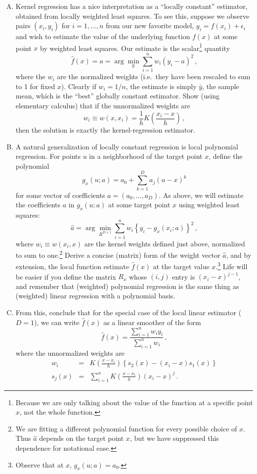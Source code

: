 \documentclass{mynotes}
\begin{document}
\begin{enumerate}[(A)]

\item Kernel regression has a nice interpretation as a ``locally constant'' estimator, obtained from locally weighted least squares.  To see this, suppose we observe pairs $(x_i, y_i)$ for $i = 1, \ldots, n$ from our new favorite model, $y_i = f(x_i) + \epsilon_i$ and wish to estimate the value of the underlying function $f(x)$ at some point $x$ by weighted least squares.  Our estimate is the scalar\footnote{Because we are only talking about the value of the function at a specific point $x$, not the whole function.} quantity
$$
\hat{f}(x) = a = \arg \min_{\mathbb{R}} \sum_{i=1}^n w_i (y_i - a)^2 \, ,
$$
where the $w_i$ are the normalized weights (i.e.~they have been rescaled to sum to 1 for fixed $x$).  Clearly if $w_i = 1/n$, the estimate is simply $\bar{y}$, the sample mean, which is the ``best'' globally constant estimator.  Show (using elementary calculus) that if the unnormalized weights are
$$
w_i \equiv w(x, x_i) = \frac{1}{h} K \left( \frac{x_i - x}{h} \right)  \, ,
$$
then the solution is exactly the kernel-regression estimator.

\item  A natural generalization of locally constant regression is local polynomial regression.  For points $u$ in a neighborhood of the target point $x$, define the polynomial
$$
g_{x}(u; a) = a_0 + \sum_{k=1}^D a_j(u-x)^k 
$$
for some vector of coefficients $a = (a_0, \ldots, a_D)$.  As above, we will estimate the coefficients $a$ in $g_{x}(u; a)$ at some target point $x$ using weighted least squares:
$$
\hat{a} = \arg \min_{R^{D+1}} \sum_{i=1}^n w_i \left\{ y_i - g_{x}(x_i; a)  \right\}^2 \, ,
$$
where $w_i \equiv w(x_i, x)$ are the kernel weights defined just above, normalized to sum to one.\footnote{We are fitting a different polynomial function for every possible choice of $x$.  Thus $\hat{a}$ depends on the target point $x$, but we have suppressed this dependence for notational ease.} Derive a concise (matrix) form of the weight vector $\hat{a}$, and by extension, the local function estimate $\hat{f}(x)$ at the target value $x$.\footnote{Observe that at $x$, $g_x(u; a) = a_0$.}   Life will be easier if you define the matrix $R_x$ whose $(i,j)$ entry is $(x_i-x)^{j-1}$, and remember that (weighted) polynomial regression is the same thing as (weighted) linear regression with a polynomial basis.

\item From this, conclude that for the special case of the local linear estimator ($D=1$), we can write $\hat{f}(x)$ as a linear smoother of the form
$$
\hat{f}(x) = \frac{\sum_{i=1}^n w_i y_i }{\sum_{i=1}^n w_i} \, ,
$$
where the unnormalized weights are
\begin{eqnarray*}
w_i &=& K \left( \frac{x-x_i}{h} \right) \left\{  s_2(x) - (x_i-x) s_1(x) \right\}\\
s_j(x) &=& \sum_{i=1}^n K \left( \frac{x-x_i}{h} \right) (x_i-x)^j \, .
\end{eqnarray*}


\end{enumerate}
\end{document}
